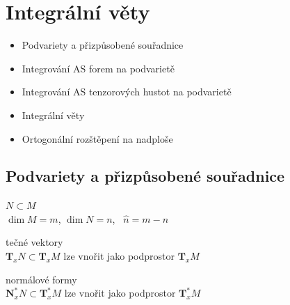 \providecommand{\gmIpatnactHust}{\mathord{\tikz[baseline=0pt,x=0.85ex,y=0.85ex,line width=0.45pt]{\draw (0,0.6)--(0.45,1.15)--(1.5,1.15)--(1.5,0.05)--(0.45,0.05)--cycle;}}}

\section{Integrální věty}

\begin{itemize}[nosep]
  \item Podvariety a přizpůsobené souřadnice
  \item Integrování AS forem na podvarietě
  \item Integrování AS tenzorových hustot na podvarietě
  \item Integrální věty
  \item Ortogonální rozštěpení na nadploše
\end{itemize}

\subsection{Podvariety a přizpůsobené souřadnice}

 \quad $N\subset M$ \\
\quad $\dim M = m$, \quad $\dim N = n$, \quad {} \ $\hat n = m - n$

tečné vektory \\
\quad $\mathbf{T}_xN\subset\mathbf{T}_xM$ \quad lze vnořit jako podprostor $\mathbf{T}_xM$ \\
\quad {}

normálové formy \\
\quad $\mathbf{N}^*_xN\subset\mathbf{T}^*_xM$ \quad lze vnořit jako podprostor $\mathbf{T}^*_xM$ \\
\quad {}


